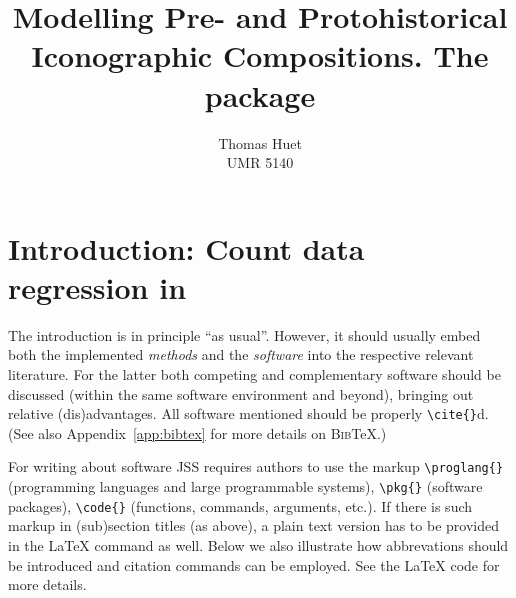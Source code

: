 \documentclass[article]{jss}
\author{Thomas Huet\\UMR 5140}
\title{Modelling Pre- and Protohistorical Iconographic Compositions. The \proglang{R} package \pkg{decorr}}
\begin{document}





\section[Introduction: Count data regression in R]{Introduction: Count data regression in } \label{sec:intro}

\begin{leftbar}
The introduction is in principle ``as usual''. However, it should usually embed
both the implemented \emph{methods} and the \emph{software} into the respective
relevant literature. For the latter both competing and complementary software
should be discussed (within the same software environment and beyond), bringing
out relative (dis)advantages. All software mentioned should be properly
\verb|\cite{}|d. (See also Appendix~\ref{app:bibtex} for more details on
\textsc{Bib}{\TeX}.)

For writing about software JSS requires authors to use the markup
\verb|\proglang{}| (programming languages and large programmable systems),
\verb|\pkg{}| (software packages), \verb|\code{}| (functions, commands,
arguments, etc.). If there is such markup in (sub)section titles (as above), a
plain text version has to be provided in the {\LaTeX} command as well. Below we
also illustrate how abbrevations should be introduced and citation commands can
be employed. See the {\LaTeX} code for more details.
\end{leftbar}
\end{document}

